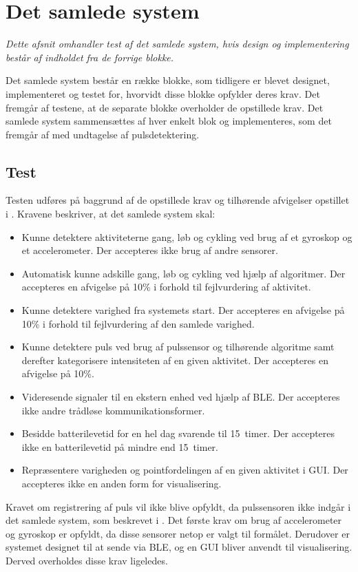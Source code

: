 \section{Det samlede system}\label{sec:samlet_system}
\textit{Dette afsnit omhandler test af det samlede system, hvis design og implementering består af indholdet fra de forrige blokke.}

Det samlede system består en række blokke, som tidligere er blevet designet, implementeret og testet for, hvorvidt disse blokke opfylder deres krav. Det fremgår af testene, at de separate blokke overholder de opstillede krav. Det samlede system sammensættes af hver enkelt blok og implementeres, som det fremgår af  med undtagelse af pulsdetektering. 

\subsection{Test}
Testen udføres på baggrund af de opstillede krav og tilhørende afvigelser opstillet i . Kravene beskriver, at det samlede system skal:
\begin{itemize}
	\item Kunne detektere aktiviteterne gang, løb og cykling ved brug af et gyroskop og et accelerometer. Der accepteres ikke brug af andre sensorer.
	\item Automatisk kunne adskille gang, løb og cykling ved hjælp af algoritmer. Der accepteres en afvigelse på 10\% i forhold til fejlvurdering af aktivitet.
	\item Kunne detektere varighed fra systemets start. Der accepteres en afvigelse på 10\% i forhold til fejlvurdering af den samlede varighed.	
	\item Kunne detektere puls ved brug af pulssensor og tilhørende algoritme samt derefter kategorisere intensiteten af en given aktivitet. Der accepteres en afvigelse på 10\%.
	\item Videresende signaler til en ekstern enhed ved hjælp af BLE. Der accepteres ikke andre trådløse kommunikationsformer.
	\item Besidde batterilevetid for en hel dag svarende til 15~timer. Der accepteres ikke en batterilevetid på mindre end 15~timer.
	\item Repræsentere varigheden og pointfordelingen af en given aktivitet i GUI. Der accepteres ikke en anden form for visualisering.	
\end{itemize}
Kravet om registrering af puls vil ikke blive opfyldt, da pulssensoren ikke indgår i det samlede system, som beskrevet i . Det første krav om brug af accelerometer og gyroskop er opfyldt, da disse sensorer netop er valgt til formålet. Derudover er systemet designet til at sende via BLE, og en GUI bliver anvendt til visualisering. Derved overholdes disse krav ligeledes. \\
